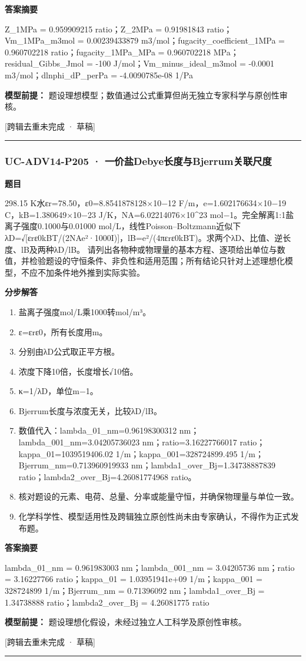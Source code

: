 \documentclass[UTF8,11pt,a4paper]{ctexart}
\begin{document}
\noindent\textbf{答案摘要}\par
Z\_1MPa = 0.959909215 ratio；Z\_2MPa = 0.91981843 ratio；Vm\_1MPa\_m3mol = 0.00239433879 m3/mol；fugacity\_coefficient\_1MPa = 0.960702218 ratio；fugacity\_1MPa\_MPa = 0.960702218 MPa；residual\_Gibbs\_Jmol = -100 J/mol；Vm\_minus\_ideal\_m3mol = -0.0001 m3/mol；dlnphi\_dP\_perPa = -4.0090785e-08 1/Pa\par
\noindent\textbf{模型前提：}
题设理想模型；数值通过公式重算但尚无独立专家科学与原创性审核。\par
\noindent\textcolor{red!65!black}{[跨辑去重未完成 · 草稿]} \par
\medskip\hrule\medskip
{}
\subsubsection*{UC-ADV14-P205 · 一价盐Debye长度与Bjerrum关联尺度}
\noindent\textbf{题目}\par
298.15 K水εr=78.50，ε0=8.8541878128×10−12 F/m，e=1.602176634×10−19 C，kB=1.380649×10−23 J/K，NA=6.02214076×10\textasciicircum{}23 mol−1。完全解离1:1盐离子强度0.1000与0.01000 mol/L，线性Poisson–Boltzmann近似下λD=√[εrε0kBT/(2NAe²·1000I)]，lB=e²/(4πεrε0kBT)。求两个λD、比值、逆长度、lB及两种λD/lB。 请列出各物种或物理量的基本方程、逐项给出单位与数值，并检验题设的守恒条件、非负性和适用范围；所有结论只针对上述理想化模型，不应不加条件地外推到实际实验。\par
\medskip\noindent\textbf{分步解答}
\begin{enumerate}
\item 盐离子强度mol/L乘1000转mol/m³。
\item ε=εrε0，所有长度用m。
\item 分别由λD公式取正平方根。
\item 浓度下降10倍，长度增长√10倍。
\item κ=1/λD，单位m−1。
\item Bjerrum长度与浓度无关，比较λD/lB。
\item 数值代入：lambda\_01\_nm=0.96198300312 nm；lambda\_001\_nm=3.04205736023 nm；ratio=3.16227766017 ratio；kappa\_01=1039519406.02 1/m；kappa\_001=328724899.495 1/m；Bjerrum\_nm=0.713960919933 nm；lambda1\_over\_Bj=1.34738887839 ratio；lambda2\_over\_Bj=4.26081774968 ratio。
\item 核对题设的元素、电荷、总量、分率或能量守恒，并确保物理量与单位一致。
\item 化学科学性、模型适用性及跨辑独立原创性尚未由专家确认，不得作为正式发布题。
\end{enumerate}
\noindent\textbf{答案摘要}\par
lambda\_01\_nm = 0.961983003 nm；lambda\_001\_nm = 3.04205736 nm；ratio = 3.16227766 ratio；kappa\_01 = 1.03951941e+09 1/m；kappa\_001 = 328724899 1/m；Bjerrum\_nm = 0.71396092 nm；lambda1\_over\_Bj = 1.34738888 ratio；lambda2\_over\_Bj = 4.26081775 ratio\par
\noindent\textbf{模型前提：}
题设理想化假设，未经过独立人工科学及原创性审核。\par
\noindent\textcolor{red!65!black}{[跨辑去重未完成 · 草稿]} \par
\medskip\hrule\medskip
{}
\end{document}
